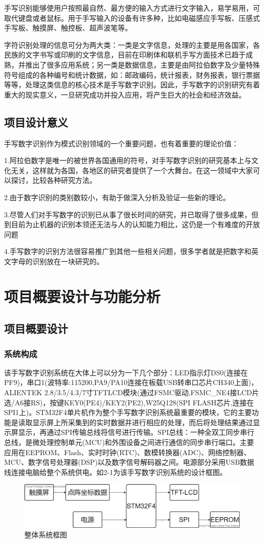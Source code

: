\documentclass[UTF8]{ctexart}
\begin{document}
手写识别能够使用户按照最自然、最方便的输入方式进行文字输入，易学易用，可取代键盘或者鼠标。用于手写输入的设备有许多种，比如电磁感应手写板、压感式手写板、触摸屏、触控板、超声波笔等。

字符识别处理的信息可分为两大类：一类是文字信息，处理的主要是用各国家，各民族的文字书写或印刷的文字信息，目前在印刷体和联机手写方面技术已趋于成熟，并推出了很多应用系统；另一类是数据信息，主要是由阿拉伯数字及少量特殊符号组成的各种编号和统计数据，如：邮政编码，统计报表，财务报表，银行票据等等，处理这类信息的核心技术是手写数字识别。因此，手写数字的识别研究有着重大的现实意义，一旦研究成功并投入应用，将产生巨大的社会和经济效益。
\subsection{项目设计意义}
手写数字识别作为模式识别领域的一个重要问题，也有着重要的理论价值：

1.阿拉伯数字是唯一的被世界各国通用的符号，对手写数字识别的研究基本上与文化无关，这样就为各国，各地区的研究者提供了一个大舞台。在这一领域中大家可以探讨，比较各种研究方法。

2.由于数字识别的类别数较小，有助于做深入分析及验证一些新的理论。

3.尽管人们对手写数字的识别已从事了很长时间的研究，并已取得了很多成果，但到目前为止机器的识别本领还无法与人的认知能力相比，这仍是一个有难度的开放问题

4.手写数字的识别方法很容易推广到其他一些相关问题，很多学者就是把数字和英文字母的识别放在一块研究的。
\section{项目概要设计与功能分析}
\subsection{项目概要设计}
\subsubsection{系统构成}
该手写数字识别系统在大体上可以分为一下几个部分：LED指示灯DS0(连接在PF9)，串口1(波特率:115200,PA9/PA10连接在板载USB转串口芯片CH340上面)，ALIENTEK 2.8/3.5/4.3/7寸TFTLCD模块(通过FSMC驱动,FSMC\_NE4接LCD片选/A6接RS)，按键KEY0(PE4)/KEY2(PE2),W25Q128(SPI FLASH芯片,连接在SPI1上)。STM32F4单片机作为整个手写数字识别系统最重要的模块，它的主要功能是读取显示屏上所采集到的实时数据并进行相应的处理，而后将处理结果通过显示屏显示，再通过SPI传输总线将信号进行传输。​ SPI总线：一种全双工同步串行总线，是微处理控制单元(MCU)和外围设备之间进行通信的同步串行端口。主要应用在EEPROM、Flash、实时时钟(RTC)、数模转换器(ADC)、网络控制器、MCU、数字信号处理器(DSP)以及数字信号解码器之间。电源部分采用USB数据线连接电脑给整个系统供电。如2-1为该手写数字识别系统的设计框图。
\begin{figure}[h]
	\centering
	\includegraphics[scale = 0.4]{2}
	\caption{整体系统框图}
\end{figure}
\end{document}
